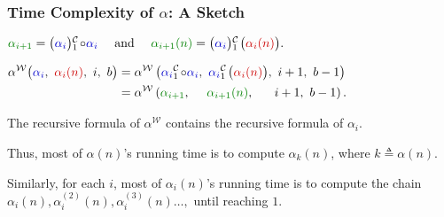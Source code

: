 \begin{frame}
\frametitle{Time Complexity of $\alpha$: A Sketch}

$
{\color{green}\alpha_{i+1}} = \cdt{\big({\color{blue}\alpha_{i}}\big)}{1}\circ {\color{blue}\alpha_i} \quad \text{ and } \quad {\color{green} \alpha_{i+1}(n)} = \cdt{\big({\color{blue}\alpha_{i}}\big)}{1}\big({\color{red}\alpha_{i}(n)}\big).
$

\bigskip

$ \displaystyle
\begin{aligned}
\alpha^{\mathcal{W}}\big({\color{blue}\alpha_i}, \ {\color{red}\alpha_i(n)}, \ i, \ b\big)
& = \alpha^{\mathcal{W}}\left(
\cdt{{\color{blue}\alpha_i}}{1}\circ {\color{blue}\alpha_i},  \
\cdt{{\color{blue}\alpha_i}}{1}\big({\color{red}\alpha_i(n)}\big), \
i+1, \ b - 1\right) \\
& = \alpha^{\mathcal{W}}\left(
{\color{green}\alpha_{i+1}}, \ \ \ \
{\color{green}\alpha_{i+1}(n)}, \ \ \ \ \
i+1, \ b - 1\right).
\end{aligned}
$

\bigskip

The recursive formula of $\alpha^{\mathcal{W}}$ contains the recursive formula of $\alpha_i$.


\bigskip

Thus, most of $\alpha(n)$'s running time is to compute $\alpha_k(n)$, where $k \triangleq \alpha(n)$.

\bigskip

Similarly, for each $i$, most of $\alpha_i(n)$'s running time is to compute the chain $\alpha_i(n), \alpha_i^{(2)}(n), \alpha_i^{(3)}(n) \ldots, $ until reaching $1$.


\end{frame}



